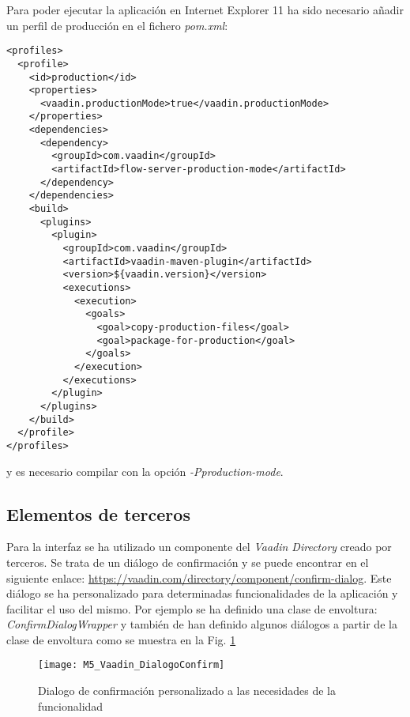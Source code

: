 Para poder ejecutar la aplicación en Internet Explorer 11 ha sido necesario añadir un perfil de producción en el fichero \textit{pom.xml}:\\
\begin{minipage}{\linewidth}
{\tiny \begin{lstlisting}
<profiles>
  <profile>
    <id>production</id>
    <properties>
      <vaadin.productionMode>true</vaadin.productionMode>
    </properties>
    <dependencies>
      <dependency>
        <groupId>com.vaadin</groupId>
        <artifactId>flow-server-production-mode</artifactId>
      </dependency>
    </dependencies>
    <build>
      <plugins>
        <plugin>
          <groupId>com.vaadin</groupId>
          <artifactId>vaadin-maven-plugin</artifactId>
          <version>${vaadin.version}</version>
          <executions>
            <execution>
              <goals>
                <goal>copy-production-files</goal>
                <goal>package-for-production</goal>
              </goals>
            </execution>
          </executions>
        </plugin>
      </plugins>
    </build>
  </profile>
</profiles>
\end{lstlisting}}
\end{minipage}
y es necesario compilar con la opción \textit{-Pproduction-mode}.

\subsection{Elementos de terceros}

Para la interfaz se ha utilizado un componente del \textit{Vaadin Directory} creado por terceros. Se trata de un diálogo de confirmación y se puede encontrar en el siguiente enlace: \url{https://vaadin.com/directory/component/confirm-dialog}. Este diálogo se ha personalizado para determinadas funcionalidades de la aplicación y facilitar el uso del mismo. Por ejemplo se ha definido una clase de envoltura: \textit{ConfirmDialogWrapper} y también de han definido algunos diálogos a partir de la clase de envoltura como se muestra en la Fig. \ref{fig:M5_Vaadin_DialogoConfirm}

\begin{figure}[!h]
	\centering
	\texttt{[image: M5\_Vaadin\_DialogoConfirm]}
	\caption{Dialogo de confirmación personalizado a las necesidades de la funcionalidad}\label{fig:M5_Vaadin_DialogoConfirm}
\end{figure}
